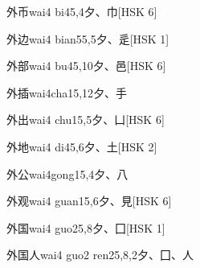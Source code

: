 \begin{EntryWithPhonetic}{外币}{wai4 bi4}{5,4}{⼣、⼱}[HSK 6]
\end{EntryWithPhonetic}

\begin{EntryWithPhonetic}{外边}{wai4 bian5}{5,5}{⼣、⾡}[HSK 1]
\end{EntryWithPhonetic}

\begin{EntryWithPhonetic}{外部}{wai4 bu4}{5,10}{⼣、⾢}[HSK 6]
\end{EntryWithPhonetic}

\begin{EntryWithPhonetic}{外插}{wai4cha1}{5,12}{⼣、⼿}
\end{EntryWithPhonetic}

\begin{EntryWithPhonetic}{外出}{wai4 chu1}{5,5}{⼣、⼐}[HSK 6]
\end{EntryWithPhonetic}

\begin{EntryWithPhonetic}{外地}{wai4 di4}{5,6}{⼣、⼟}[HSK 2]
\end{EntryWithPhonetic}

\begin{EntryWithPhonetic}{外公}{wai4gong1}{5,4}{⼣、⼋}
\end{EntryWithPhonetic}

\begin{EntryWithPhonetic}{外观}{wai4 guan1}{5,6}{⼣、⾒}[HSK 6]
\end{EntryWithPhonetic}

\begin{EntryWithPhonetic}{外国}{wai4 guo2}{5,8}{⼣、⼞}[HSK 1]
\end{EntryWithPhonetic}

\begin{EntryWithPhonetic}{外国人}{wai4 guo2 ren2}{5,8,2}{⼣、⼞、⼈}
\end{EntryWithPhonetic}

